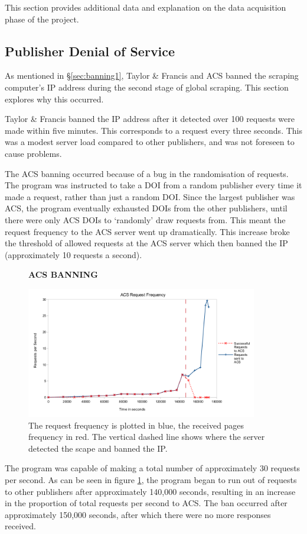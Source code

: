 \label{sec:data_acc_appendix}
This section provides additional data and explanation on the data acquisition phase of the project.
\subsection{Publisher Denial of Service}
\label{sec:banning2}
As mentioned in \S\ref{sec:banning1}, Taylor \& Francis and ACS banned the scraping computer's IP address during the second stage of global scraping. This section explores why this occurred.

Taylor \& Francis banned the IP address after it detected over 100 requests were made within five minutes. This corresponds to a request every three seconds. This was a modest server load compared to other publishers, and was not foreseen to cause problems.

The ACS banning occurred because of a bug in the randomisation of requests. The program was instructed to take a DOI from a random publisher every time it made a request, rather than just a random DOI. Since the largest publisher was ACS, the program eventually exhausted DOIs from the other publishers, until there were only ACS DOIs to `randomly' draw requests from. This meant the request frequency to the ACS server went up dramatically. This increase broke the threshold of allowed requests at the ACS server which then banned the IP (approximately 10 requests a second).

\begin{figure}[H]
    \centering
    \textbf{ACS BANNING}\par\medskip
    \includegraphics[width=0.9\textwidth]{Data_Acquisition/ACS_crash_line.png}
    \caption[Request Frequency Leading to ACS Ban]{The request frequency is plotted in blue, the received pages frequency in red. The vertical dashed line shows where the server detected the scape and banned the IP.}
     \label{fig:ACSBAN}
\end{figure}
The program was capable of making a total number of approximately 30 requests per second. As can be seen in figure \ref{fig:ACSBAN}, the program began to run out of requests to other publishers after approximately 140,000 seconds, resulting in an increase in the proportion of total requests per second to ACS. The ban occurred after approximately 150,000 seconds, after which there were no more responses received.

